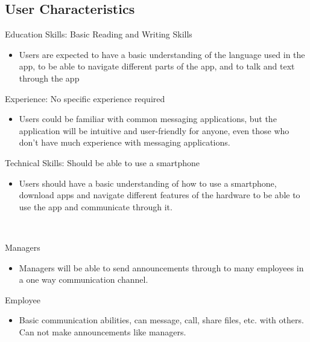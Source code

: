 \documentclass[]{article}
\begin{document}
\subsection{User Characteristics}
\label{sub:user_characteristics}
Education Skills: Basic Reading and Writing Skills
\begin{itemize}
	\item Users are expected to have a basic understanding of the language used in the app, to be able to navigate different parts of the app, and to talk and text through the app
\end{itemize}
\label{sub:user_characteristics}
Experience: No specific experience required
\begin{itemize}
	\item Users could be familiar with common messaging applications, but the application will be intuitive and user-friendly for anyone, even those who don't have much experience with messaging applications.
\end{itemize}
Technical Skills: Should be able to use a smartphone
\begin{itemize}
	\item Users should have a basic understanding of how to use a smartphone, download apps and navigate different features of the hardware to be able to use the app and communicate through it.
\end{itemize}
\\
\label{sub:user_characteristics}

Managers
\begin{itemize}
	\item Managers will be able to send announcements through to many employees in a one way communication channel.
\end{itemize}
\label{sub:user_characteristics}
Employee
\begin{itemize}
	\item Basic communication abilities, can message, call, share files, etc. with others. Can not make announcements like managers.
\end{itemize}
\end{document}

